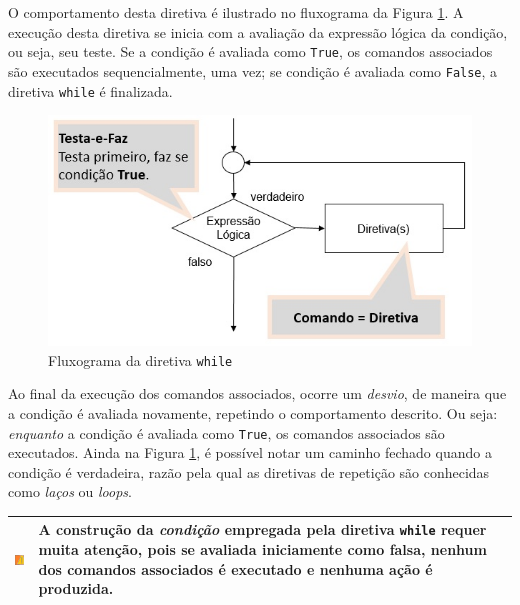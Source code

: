 \documentclass[
]{book}
\begin{document}
O comportamento desta diretiva é ilustrado no fluxograma da Figura \ref{fig:05-01}. A execução desta diretiva se inicia com a avaliação da expressão lógica da condição, ou seja, seu teste. Se a condição é avaliada como \texttt{True}, os comandos associados são executados sequencialmente, uma vez; se condição é avaliada como \texttt{False}, a diretiva \texttt{while} é finalizada.

\begin{figure}
\centering
\includegraphics{images/05-01.jpg}
\caption{\label{fig:05-01}Fluxograma da diretiva \texttt{while}}
\end{figure}

Ao final da execução dos comandos associados, ocorre um \emph{desvio}, de maneira que a condição é avaliada novamente, repetindo o comportamento descrito. Ou seja: \emph{enquanto} a condição é avaliada como \texttt{True}, os comandos associados são executados. Ainda na Figura \ref{fig:05-01}, é possível notar um caminho fechado quando a condição é verdadeira, razão pela qual as diretivas de repetição são conhecidas como \emph{laços} ou \emph{loops}.

\begin{longtable}[]{@{}
  >{\centering\arraybackslash}p{}
  >{\raggedright\arraybackslash}p{}@{}}
\toprule
\includegraphics{images/warn.png} & A construção da \emph{condição} empregada pela diretiva \texttt{while} requer muita atenção, pois se avaliada iniciamente como falsa, nenhum dos comandos associados é executado e nenhuma ação é produzida. \\
\midrule
\endhead
\bottomrule
\end{longtable}
\end{document}
